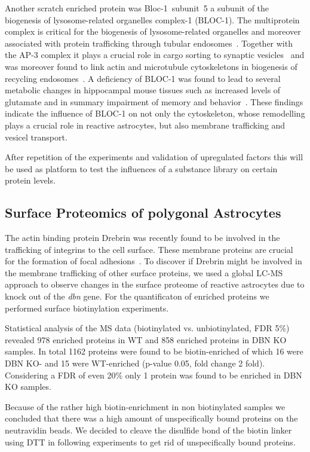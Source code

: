 \documentclass[a4paper,11pt,bibtotocnumbered]{article}
\begin{document}
Another scratch enriched protein was Bloc-1~subunit~5 a subunit of the biogenesis of lysosome-related organelles complex-1 (BLOC-1). The multiprotein complex is critical for the biogenesis of lysosome-related organelles and moreover associated with protein trafficking through tubular endosomes~\cite{Pietro2006, Lee2012}. Together with the AP-3 complex it plays a crucial role in cargo sorting to synaptic vesicles~\cite{Newell-Litwa2009} and was moreover found to link actin and microtubule cytoskeletons in biogenesis of recycling endosomes~\cite{Delevoye2016}. A deficiency of BLOC-1 was found to lead to several metabolic changes in hippocampal mouse tissues such as increased levels of glutamate and in summary impairment of memory and behavior~\cite{Liempd2017}.
These findings indicate the influence of BLOC-1 on not only the cytoskeleton, whose remodelling plays a crucial role in reactive astrocytes, but also membrane trafficking and vesicel transport. 

After repetition of the experiments and validation of upregulated factors this will be used as platform to test the influences of a substance library on certain protein levels.    

\subsection{Surface Proteomics of polygonal Astrocytes}

The actin binding protein Drebrin was recently found to be involved in the trafficking of integrins to the cell surface. These membrane proteins are crucial for the formation of focal adhesions~\cite{Schiweck2020}. To discover if Drebrin might be involved in the membrane trafficking of other surface proteins, we used a global LC-MS approach to observe changes in the surface proteome of reactive astrocytes due to knock out of the \textit{dbn} gene. For the quantificaton of enriched proteins we performed surface biotinylation experiments.

Statistical analysis of the MS data (biotinylated vs. unbiotinylated, FDR 5\%) revealed 978 enriched proteins in WT and 858 enriched proteins in DBN KO samples. In total 1162 proteins were found to be biotin-enriched of which 16 were DBN KO- and 15 were WT-enriched (p-value 0.05, fold change 2 fold). Considering a FDR of even 20\% only 1 protein was found to be enriched in DBN KO samples.

Because of the rather high biotin-enrichment in non biotinylated samples we concluded that there was a high amount of unspecifically bound proteins on the neutravidin beads. We decided to cleave the disulfide bond of the biotin linker using DTT in following experiments to get rid of unspecifically bound proteins.
\end{document}
